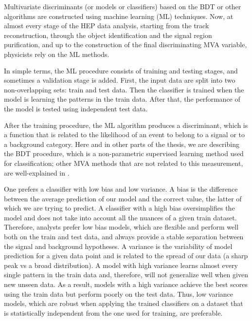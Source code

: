 Multivariate discriminants (or models or classifiers) based on the BDT or other algorithms are constructed using machine learning (ML) techniques. Now, at almost every stage of the HEP data analysis, starting from the track reconstruction, through the object identification and the signal region purification, and up to the construction of the final discriminating MVA variable, physicists rely on the ML methods.

In simple terms, the ML procedure consists of training and testing stages, and sometimes a validation stage is added. First, the input data are split into two non-overlapping sets: train and test data. Then the classifier is trained when the model is learning the patterns in the train data. After that, the performance of the model is tested using independent test data. 

After the training procedure, the ML algorithm produces a discriminant, which is a function that is related to the likelihood of an event to belong to a signal or to a background category. Here and in other parts of the thesis, we are describing the BDT procedure, which is a non-parametric supervised learning method used for classification; other MVA methods that are not related to this measurement, are well-explained in \cite{book:411471}. 

One prefers a classifier with low bias and low variance. A bias is the difference between the average prediction of our model and the correct value, the latter of which we are trying to predict. A classifier with a high bias oversimplifies the model and does not take into account all the nuances of a given train dataset. Therefore, analysts prefer low bias models, which are flexible and perform well both on the train and test data, and always provide a stable separation between the signal and background hypotheses. A variance is the variability of model prediction for a given data point and is related to the spread of our data (a sharp peak vs a broad distribution). A model with high variance learns almost every single pattern in the train data and, therefore, will not generalize well when given new unseen data. As a result, models with a high variance achieve the best scores using the train data but perform poorly on the test data. Thus, low variance models, which are robust when applying the trained classifiers on a dataset that is statistically independent from the one used for training, are preferable.

